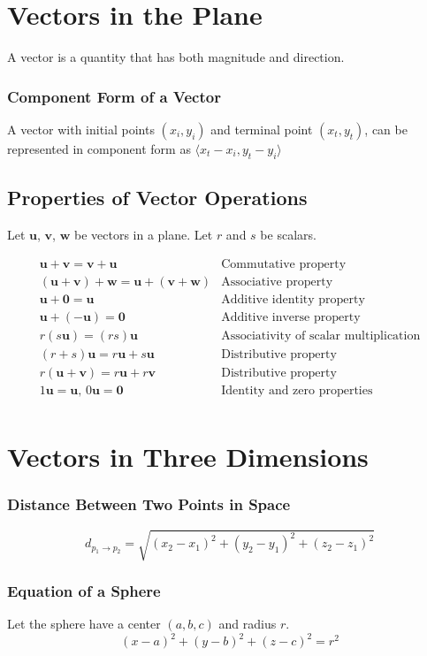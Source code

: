 \documentclass{article}
\begin{document}
\section*{Vectors in the Plane}

A vector is a quantity that has both magnitude and direction.

\subsubsection*{Component Form of a Vector}
A vector with initial points $(x_i, y_i)$ and terminal point $(x_t, y_t)$, can be represented in component form as $\langle x_t - x_i, y_t - y_i \rangle$

\subsection*{Properties of Vector Operations}
Let $\mathbf{u}$, $\mathbf{v}$, $\mathbf{w}$ be vectors in a plane. Let $r$ and $s$ be scalars.

\[
\begin{array}{ll}
\mathbf{u} + \mathbf{v} = \mathbf{v} + \mathbf{u} & \text{Commutative property} \\[5pt]
(\mathbf{u} + \mathbf{v}) + \mathbf{w} = \mathbf{u} + (\mathbf{v} + \mathbf{w}) & \text{Associative property} \\[5pt]
\mathbf{u} + \mathbf{0} = \mathbf{u} & \text{Additive identity property} \\[5pt]
\mathbf{u} + (-\mathbf{u}) = \mathbf{0} & \text{Additive inverse property} \\[5pt]
r (s \mathbf{u}) = (rs) \mathbf{u} & \text{Associativity of scalar multiplication} \\[5pt]
(r + s) \mathbf{u} = r\mathbf{u} + s\mathbf{u} & \text{Distributive property} \\[5pt]
r (\mathbf{u} + \mathbf{v}) = r\mathbf{u} + r\mathbf{v} & \text{Distributive property} \\[5pt]
1 \mathbf{u} = \mathbf{u}, \, 0\mathbf{u} = \mathbf{0} & \text{Identity and zero properties} \\[5pt]
\end{array}
\]

\section*{Vectors in Three Dimensions}

\subsubsection*{Distance Between Two Points in Space}
\[d_{p_1\rightarrow p_2} = \sqrt{{(x_2 - x_1)}^2 + {(y_2 - y_1)}^2 + {(z_2 - z_1)}^2}\]

\subsubsection*{Equation of a Sphere}
Let the sphere have a center $(a, b, c)$ and radius $r$.
\[{(x-a)}^2 + {(y-b)}^2 + {(z-c)}^2 = r^2\]
\end{document}
